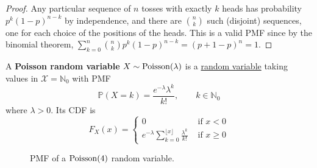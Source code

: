   \begin{proof}
    Any particular sequence of $n$ tosses with exactly $k$ heads has probability $p^k (1-p)^{n-k}$ by independence, and there are $\binom{n}{k}$ such (disjoint) sequences, one for each choice of the positions of the heads. This is a valid PMF since by the binomial theorem, $\sum_{k=0}^n \binom{n}{k} p^k (1-p)^{n-k} = (p + 1 - p)^n = 1$. 
  \end{proof}

  \begin{definition}
    \label{def:poisson-random-variable}
    A \textbf{Poisson random variable} $X \sim \operatorname{Poisson}(\lambda)$ is a \hyperref[def:discrete-random-variable]{random variable} taking values in $\mathcal{X} = \mathbb{N}_0$ with PMF 
    \begin{equation}
      \mathbb{P}(X = k) = \frac{e^{-\lambda} \lambda^k}{k!}, \qquad k \in \mathbb{N}_0
    \end{equation}
    where $\lambda > 0$. 
    Its CDF is 
    \begin{equation}
      F_X (x) = \begin{cases} 0 & \text{ if } x < 0 \\ e^{-\lambda} \sum_{k=0}^{\lfloor x \rfloor} \frac{\lambda^k}{k!} & \text{ if } x \geq 0 \end{cases}
    \end{equation}
  \begin{center}
    \captionsetup{type=figure}
    \begin{subfigure}[b]{0.48\textwidth}
      \centering
      \caption{PMF of a $\operatorname{Poisson}(4)$ random variable.}
      \label{fig:poisson-pmf}
    \end{subfigure}
    \hfill 
    \begin{subfigure}[b]{0.48\textwidth}
      \centering
      \begin{tikzpicture}

\end{tikzpicture}
\end{subfigure}
\end{center}
\end{definition}
